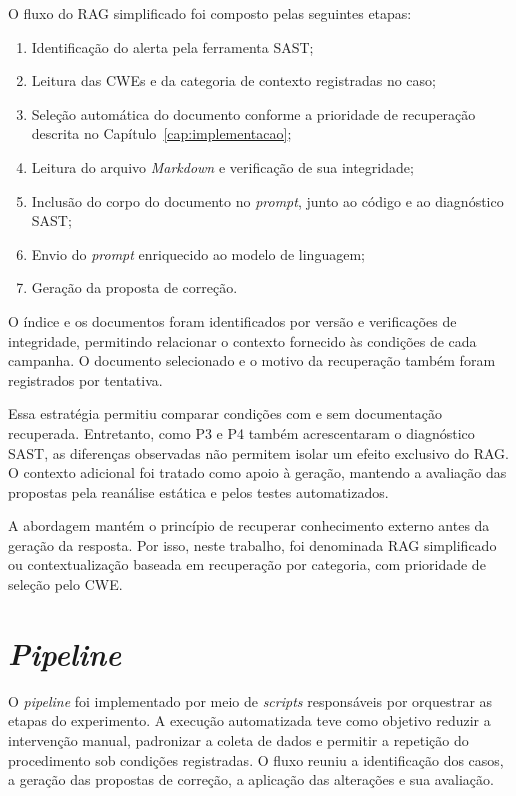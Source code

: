 O fluxo do RAG simplificado foi composto pelas seguintes etapas:

\begin{enumerate}
    \item Identificação do alerta pela ferramenta SAST;
    \item Leitura das CWEs e da categoria de contexto registradas no caso;
    \item Seleção automática do documento conforme a prioridade de recuperação descrita no Capítulo~\ref{cap:implementacao};
    \item Leitura do arquivo \textit{Markdown} e verificação de sua integridade;
    \item Inclusão do corpo do documento no \textit{prompt}, junto ao código e ao diagnóstico SAST;
    \item Envio do \textit{prompt} enriquecido ao modelo de linguagem;
    \item Geração da proposta de correção.
\end{enumerate}

O índice e os documentos foram identificados por versão e verificações de integridade, permitindo relacionar o contexto fornecido às condições de cada campanha. O documento selecionado e o motivo da recuperação também foram registrados por tentativa.

Essa estratégia permitiu comparar condições com e sem documentação recuperada. Entretanto, como P3 e P4 também acrescentaram o diagnóstico SAST, as diferenças observadas não permitem isolar um efeito exclusivo do RAG. O contexto adicional foi tratado como apoio à geração, mantendo a avaliação das propostas pela reanálise estática e pelos testes automatizados.

A abordagem mantém o princípio de recuperar conhecimento externo antes da geração da resposta. Por isso, neste trabalho, foi denominada RAG simplificado ou contextualização baseada em recuperação por categoria, com prioridade de seleção pelo CWE.

\section{\textit{Pipeline}}
\label{sec:met-pipeline}

O \textit{pipeline} foi implementado por meio de \textit{scripts} responsáveis por orquestrar as etapas do experimento. A execução automatizada teve como objetivo reduzir a intervenção manual, padronizar a coleta de dados e permitir a repetição do procedimento sob condições registradas. O fluxo reuniu a identificação dos casos, a geração das propostas de correção, a aplicação das alterações e sua avaliação.


